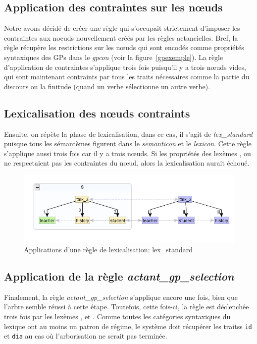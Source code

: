 \subsection{Application des contraintes sur les n\oe{}uds}
Notre avons décidé de créer une règle qui s'occupait strictement d'imposer les contraintes aux noeuds nouvellement créés par les règles actancielles. Bref, la règle récupère les restrictions sur les n\oe{}uds qui sont encodés comme propriétés syntaxiques des \acp{GP} dans le \emph{gpcon} (voir la figure~\ref{gpexemple}). La règle d'application de contraintes s'applique trois fois puisqu'il y a trois n\oe{}uds vides, qui sont maintenant contraints par tous les traits nécessaires comme la partie du discours ou la finitude (quand un verbe sélectionne un autre verbe).

\subsection{Lexicalisation des n\oe{}uds contraints}
Ensuite, on répète la phase de lexicalisation, dans ce cas, il s'agit de \emph{lex\_standard} puisque tous les sémantèmes figurent dans le \emph{semanticon} et le \emph{lexicon}. Cette règle s'applique aussi trois fois car il y a trois n\oe{}uds. Si les propriétés des lexèmes ,  ou  ne respectaient pas les contraintes du n\oe{}ud, alors la lexicalisation aurait échoué.
\begin{figure}[htb]
	\centering
	\includegraphics[width=1\textwidth, trim = {0cm 0cm 0cm 0cm},clip]{ch6/figs/lex.png}
	\caption{Applications d'une règle de lexicalisation: lex\_standard}
	\label{deroulement3}
\end{figure}

\subsection{Application de la règle \emph{actant\_gp\_selection}}
Finalement, la règle \emph{actant\_gp\_selection} s'applique encore une fois, bien que l'arbre semble réussi à cette étape. Toutefois, cette fois-ci, la règle est déclenchée trois fois par les lexèmes , et . Comme toutes les catégories syntaxiques du lexique ont au moins un patron de régime, le système doit récupérer les traitss \texttt{id} et \texttt{dia} au cas où l'arborisation ne serait pas terminée. 

